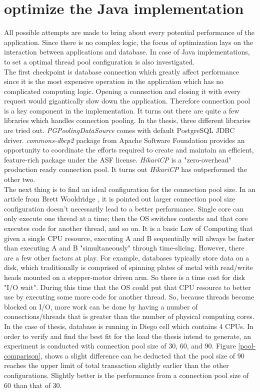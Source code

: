\section{optimize the Java implementation}
All possible attempts are made to bring about every potential performance of the application. Since there is no complex logic, the focus of optimization lays on the interaction between applications and database. In case of Java implementations, to set a optimal thread pool configuration is also investigated. \\
The first checkpoint is database connection which greatly affect performance since it is the most expensive operation in the application which has no complicated computing logic. Opening a connection and closing it with every request would gigantically slow down the application. Therefore connection pool is a key component in the implementation. It turns out there are quite a few libraries which handles connection pooling. In the thesis,  three different libraries are tried out. \textit{PGPoolingDataSource}  \citep{pgpool}   comes with default PostgreSQL JDBC driver. \textit{commons-dbcp2} \citep{dbcp} package from Apache Software Foundation provides an opportunity to coordinate the efforts required to create and maintain an efficient, feature-rich package under the \ac{ASF} license. \textit{HikariCP} is a "zero-overhead" production ready connection pool. It turns out \textit{HikariCP} \citep{hikari} has outperformed the other two. \\
The next thing is to find an ideal configuration for the connection pool size. In an article from Brett Wooldridge \citep{hikari}, it is pointed out larger connection pool size configuration doesn't necessarily lead to a better performance. Single core can only execute one thread at a time; then the OS switches contexts and that core executes code for another thread, and so on. It is a basic Law of Computing that given a single CPU resource, executing A and B sequentially will always be faster than executing A and B "simultaneously" through time-slicing. However, there are a few other factors at play. For example, databases typically store data on a disk, which traditionally is comprised of spinning plates of metal with read/write heads mounted on a stepper-motor driven arm. So there is a time cost for disk "I/O wait".  During this time that the OS could put that CPU resource to better use by executing some more code for another thread. So, because threads become blocked on I/O,  more work can be done by having a number of connections/threads that is greater than the number of physical computing cores. In the case of thesis, database is running in Diego cell which contains 4 CPUs. In order to verify and find the best fit for the load the thesis intend to generate, an experiment is conducted with connection pool size of 30, 60, and 90.  Figure \ref{pool-comparison}, shows a slight difference can be deducted that the pool size of 90 reaches the upper limit of total transaction slightly earlier than the other configurations. Slightly better is the performance from a connection pool size of 60 than that of 30.

